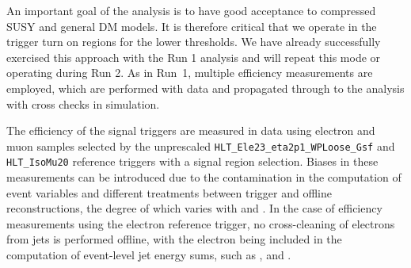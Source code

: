An important goal of the analysis is to have good acceptance
to compressed SUSY and general DM models. It is therefore critical
that we operate in the trigger turn on regions for the lower
thresholds. We have already successfully exercised this approach with 
the Run 1 analysis and will repeat this mode or operating during Run 2.
As in Run~1, multiple efficiency measurements are
employed, which are performed with data and propagated through to the
analysis with cross checks in simulation. 



The efficiency of the signal triggers are measured in data using electron and muon samples 
selected by the unprescaled \verb!HLT_Ele23_eta2p1_WPLoose_Gsf! and \verb!HLT_IsoMu20! 
reference triggers with a signal region selection. Biases in these measurements can be introduced 
due to the contamination in the computation of event variables and different treatments 
between trigger and offline reconstructions, the degree of which varies with
\scalht and \njet. In the case of efficiency measurements using the electron
reference trigger, no cross-cleaning of electrons from jets is performed
offline, with the electron being included in the computation of event-level jet
energy sums, such as \scalht, \MHT and \alt.


